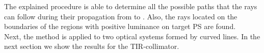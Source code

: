\begin{algorithm}
\begin{algorithmic}[1]
\If {$\lineaj\neq \nline$}
\State{}
\EndIf 
\State{}
\EndIf
\EndProcedure
\end{algorithmic}
\end{algorithm}
The explained procedure is able to determine all the possible paths that the rays can follow during their propagation from  to . Also, the rays located on the boundaries of the regions with positive luminance on target PS  are found.\\ \indent
Next, the method is applied to two optical systems formed by curved lines. In the next section we show the results for the TIR-collimator.
